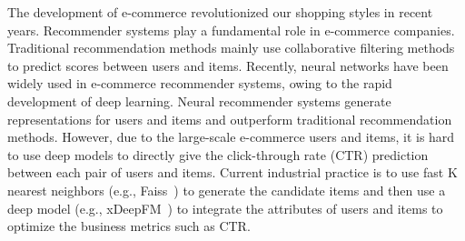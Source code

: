 
The development of e-commerce revolutionized our shopping styles in recent years. Recommender systems play a fundamental role in e-commerce companies. 
Traditional recommendation methods mainly use collaborative filtering methods~\cite{sarwar2001item,schafer2007collaborative} to predict scores between users and items. Recently, neural networks have been widely used in e-commerce recommender systems, owing to the rapid development of deep learning. Neural recommender systems generate representations for users and items and outperform traditional recommendation methods. However, due to the large-scale e-commerce users and items, it is hard to use deep models to directly give the click-through rate (CTR) prediction between each pair of users and items. Current industrial practice is to use fast K nearest neighbors (e.g., Faiss~\cite{JDH17}) to generate the candidate items and then use a deep model (e.g., xDeepFM~\cite{lian2018xdeepfm}) to integrate the attributes of users and items to optimize the business metrics such as CTR.


